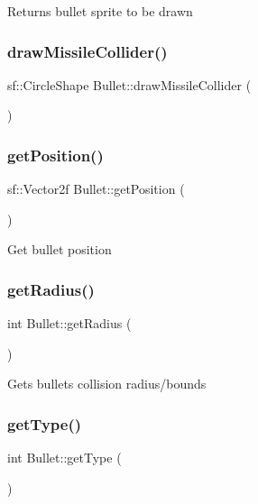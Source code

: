 Returns bullet sprite to be drawn \mbox{\label{class_bullet_ac8c9c18e09ff7ef97313aa0c805c9846}} 
\subsubsection{\texorpdfstring{draw\+Missile\+Collider()}{drawMissileCollider()}}
{\footnotesize\ttfamily sf\+::\+Circle\+Shape Bullet\+::draw\+Missile\+Collider (\begin{DoxyParamCaption}{ }\end{DoxyParamCaption})}

\mbox{\label{class_bullet_a64e4ce634f62ab31d338bd142c1987c9}} 
\subsubsection{\texorpdfstring{get\+Position()}{getPosition()}}
{\footnotesize\ttfamily sf\+::\+Vector2f Bullet\+::get\+Position (\begin{DoxyParamCaption}{ }\end{DoxyParamCaption})}

Get bullet position \mbox{\label{class_bullet_a781ca8ccaf366435ece65eacd79e8b44}} 
\subsubsection{\texorpdfstring{get\+Radius()}{getRadius()}}
{\footnotesize\ttfamily int Bullet\+::get\+Radius (\begin{DoxyParamCaption}{ }\end{DoxyParamCaption})}

Gets bullets collision radius/bounds \mbox{\label{class_bullet_a73634149134359bca3f2201fb6284707}} 
\subsubsection{\texorpdfstring{get\+Type()}{getType()}}
{\footnotesize\ttfamily int Bullet\+::get\+Type (\begin{DoxyParamCaption}{ }\end{DoxyParamCaption})}

